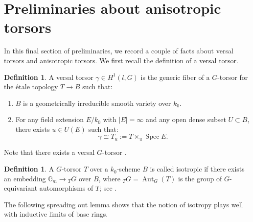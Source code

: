 \documentclass[12pt]{amsart}
\numberwithin{equation}{section}
\theoremstyle{definition}
\newtheorem{definition}[theorem]{Definition}
\newcommand{\Gm}{\mathbb{G}_m}
\newcommand{\Aut}{\operatorname{Aut}}
\newcommand{\Spec}{\operatorname{Spec}}
\begin{document}
\section{Preliminaries about anisotropic torsors}\label{sect.pre_isotrop}

In this final section of preliminaries, we record a couple of facts about versal torsors and anisotropic torsors. We first recall the definition of a versal torsor.
\begin{definition}\label{def.versal}
    A versal torsor $\gamma \in H^1(l,G)$ is the generic fiber of a $G$-torsor for the \'etale topology $T\to B$ such that:
    \begin{enumerate}
        \item $B$ is a geometrically irreducible smooth variety over $k_0$.
        \item For any field extension $E/k_0$ with $|E|=\infty$ and any open dense subset $U\subset B$, there exists $u\in U(E)$ such that:
        $$\gamma \cong T_u := T \times_u \Spec E.$$
    \end{enumerate}
\end{definition}
Note that there exists a versal $G$-torsor \cite[Section 5.3]{serre-ci}.
\begin{definition}
    A $G$-torsor $T$ over a $k_0$-scheme $B$ is called isotropic if there exists an embedding $\Gm \to {}_T G$ over $B$, where ${}_T G = \Aut_G(T)$ is the group of $G$-equivariant automorphisms of $T$; see \cite[Page 6]{gille2016classification}.
\end{definition} 
The following spreading out lemma shows that the notion of isotropy plays well with inductive limits of base rings. 
\end{document}
